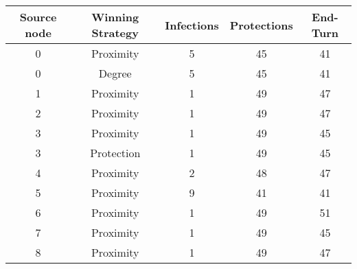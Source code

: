 \documentclass[results.tex]{subfiles}
\begin{document}
    \begin{center}
        \begin{tabular}{| c || c | c | c | c |}
            \hline
            {\bfseries Source node} & {\bfseries Winning Strategy} & {\bfseries Infections} & {\bfseries Protections}
            & {\bfseries End-Turn}
            \\  %
            \hline\hline
            0                       & Proximity                    & 5                      & 45                      & 41                   \\
            \hline
            0                       & Degree                       & 5                      & 45                      & 41                   \\
            \hline
            1                       & Proximity                    & 1                      & 49                      & 47                   \\
            \hline
            2                       & Proximity                    & 1                      & 49                      & 47                   \\
            \hline
            3                       & Proximity                    & 1                      & 49                      & 45                   \\
            \hline
            3                       & Protection                   & 1                      & 49                      & 45                   \\
            \hline
            4                       & Proximity                    & 2                      & 48                      & 47                   \\
            \hline
            5                       & Proximity                    & 9                      & 41                      & 41                   \\
            \hline
            6                       & Proximity                    & 1                      & 49                      & 51                   \\
            \hline
            7                       & Proximity                    & 1                      & 49                      & 45                   \\
            \hline
            8                       & Proximity                    & 1                      & 49                      & 47                   \\

\end{tabular}
\end{center}
\end{document}
